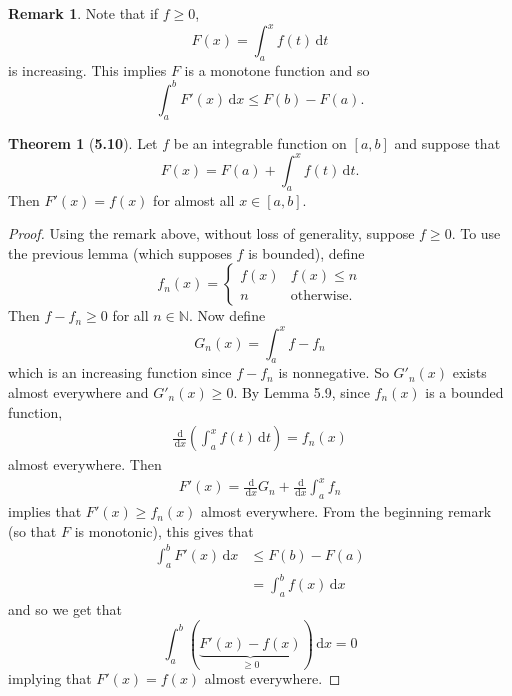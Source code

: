 \documentclass[12pt]{article}
\newcommand{\N}{\mathbb{N}}
\newcommand{\dif}{\, \mathrm{d}}
\theoremstyle{definition}
\newtheorem*{thm}{Theorem}
\newtheorem*{remark}{Remark}
\begin{document}
\begin{remark}
    Note that if \( f \geq 0 \), 
        \[  
            F(x) = \int_{a}^{x} f(t) \dif t
        \]
    is increasing. This implies \( F \) is a monotone function and so 
        \[
            \int_{a}^{b} F'(x) \dif x \leq F(b) - F(a).    
        \]
\end{remark}

\begin{thm}[\textbf{5.10}]

    Let \( f \) be an integrable function on \( [a,b] \) and suppose that 
        \[  
            F(x) = F(a) + \int_{a}^{x} f(t) \dif t.
        \]
    Then \( F'(x) = f(x) \) for almost all \( x \in [a,b] \).

        \begin{proof}
            Using the remark above, without loss of generality, suppose \( f \geq 0 \). To use the previous lemma (which supposes \( f \) is bounded), define
                \[
                    f_n(x) = \begin{cases}
                        f(x) & f(x) \leq n \\
                        n & \text{otherwise}.
                    \end{cases}  
                \]
            Then \( f - f_n \geq 0 \) for all \( n \in \N \). Now define 
                \[  
                    G_n(x) = \int_{a}^{x} f  - f_n    
                \]
            which is an increasing function since \( f - f_n \) is nonnegative. 
            So \( G'_n(x) \) exists almost everywhere and \( G'_n(x) \geq 0 \). 
            By Lemma 5.9, since \( f_n(x) \) is a bounded function,
                \begin{align*}
                    \frac{\dif}{\dif x} \left( \int_{a}^{x} f(t) \dif t \right) = f_n(x)
                \end{align*}
            almost everywhere. Then 
                \begin{align*}
                    F'(x) = \frac{\dif }{\dif x} G_n + \frac{\dif }{\dif x} \int_{a}^{x} f_n
                \end{align*}
            implies that \( F'(x) \geq f_n(x) \) almost everywhere.
            From the beginning remark (so that \( F \) is monotonic), this gives that
                \begin{align*}
                    \int_{a}^{b} F'(x) \dif x &\leq F(b) - F(a) \\
                    &= \int_{a}^{b} f(x) \dif x
                \end{align*}
            and so we get that 
                \[
                    \int_{a}^{b} \left( \underbrace{F'(x) - f(x)}_{\geq 0} \right) \dif x  = 0  
                \]
            implying that \( F'(x) = f(x) \) almost everywhere. 
        \end{proof}
\end{thm}
\end{document}
